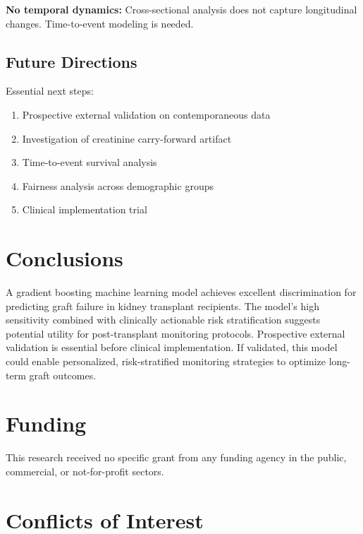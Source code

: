 \documentclass[11pt,a4paper]{article}
\begin{document}
\textbf{No temporal dynamics:} Cross-sectional analysis does not capture longitudinal changes. Time-to-event modeling is needed.

\subsection{Future Directions}

Essential next steps:
\begin{enumerate}
    \item Prospective external validation on contemporaneous data
    \item Investigation of creatinine carry-forward artifact
    \item Time-to-event survival analysis
    \item Fairness analysis across demographic groups
    \item Clinical implementation trial
\end{enumerate}

\section{Conclusions}

A gradient boosting machine learning model achieves excellent discrimination for predicting graft failure in kidney transplant recipients. The model's high sensitivity combined with clinically actionable risk stratification suggests potential utility for post-transplant monitoring protocols. Prospective external validation is essential before clinical implementation. If validated, this model could enable personalized, risk-stratified monitoring strategies to optimize long-term graft outcomes.

\section*{Funding}

This research received no specific grant from any funding agency in the public, commercial, or not-for-profit sectors.

\section*{Conflicts of Interest}
\end{document}
